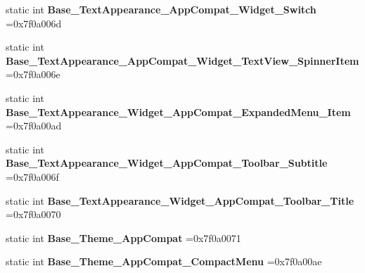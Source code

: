 \begin{DoxyCompactItemize}
static int {\bfseries Base\+\_\+\+Text\+Appearance\+\_\+\+App\+Compat\+\_\+\+Widget\+\_\+\+Switch} =0x7f0a006d
\item 
\mbox{\label{classandroid_1_1support_1_1graphics_1_1drawable_1_1animated_1_1R_1_1style_a31726fc3af1cc4b3c30f38f2ff5825c6}} 
static int {\bfseries Base\+\_\+\+Text\+Appearance\+\_\+\+App\+Compat\+\_\+\+Widget\+\_\+\+Text\+View\+\_\+\+Spinner\+Item} =0x7f0a006e
\item 
\mbox{\label{classandroid_1_1support_1_1graphics_1_1drawable_1_1animated_1_1R_1_1style_a63cf7f1f3c2e1c86443ccd01528de373}} 
static int {\bfseries Base\+\_\+\+Text\+Appearance\+\_\+\+Widget\+\_\+\+App\+Compat\+\_\+\+Expanded\+Menu\+\_\+\+Item} =0x7f0a00ad
\item 
\mbox{\label{classandroid_1_1support_1_1graphics_1_1drawable_1_1animated_1_1R_1_1style_ac119bb2e6bf3f0e419d64d1ba4fe9901}} 
static int {\bfseries Base\+\_\+\+Text\+Appearance\+\_\+\+Widget\+\_\+\+App\+Compat\+\_\+\+Toolbar\+\_\+\+Subtitle} =0x7f0a006f
\item 
\mbox{\label{classandroid_1_1support_1_1graphics_1_1drawable_1_1animated_1_1R_1_1style_a9bc8e2b3d1c548f922596fd9f464ef4b}} 
static int {\bfseries Base\+\_\+\+Text\+Appearance\+\_\+\+Widget\+\_\+\+App\+Compat\+\_\+\+Toolbar\+\_\+\+Title} =0x7f0a0070
\item 
\mbox{\label{classandroid_1_1support_1_1graphics_1_1drawable_1_1animated_1_1R_1_1style_aac115a083772666f8575b2ff1455e49d}} 
static int {\bfseries Base\+\_\+\+Theme\+\_\+\+App\+Compat} =0x7f0a0071
\item 
\mbox{\label{classandroid_1_1support_1_1graphics_1_1drawable_1_1animated_1_1R_1_1style_ad7c6e9ea421b29612ec4decfe90294c8}} 
static int {\bfseries Base\+\_\+\+Theme\+\_\+\+App\+Compat\+\_\+\+Compact\+Menu} =0x7f0a00ae
\item 
\mbox{\label{classandroid_1_1support_1_1graphics_1_1drawable_1_1animated_1_1R_1_1style_a2f5c96fcbf6edd55d62ff12cbc7d16e3}} 

\end{DoxyCompactItemize}

